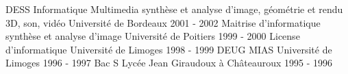 \begin{cvhonors}
  \cvhonor
    {DESS Informatique Multimedia}
    {\lastnewline synthèse et analyse d'image, géométrie et rendu 3D, son,
    vidéo} {Université de Bordeaux}
    {2001 - 2002}
  \cvhonor
    {Maitrise d'informatique}
    {synthèse et analyse d'image}
    {Université de Poitiers}
    {1999 - 2000}
  \cvhonor
    {License d'informatique}
    {}
    {Université de Limoges}
    {1998 - 1999}
  \cvhonor
    {DEUG MIAS}
    {}
    {Université de Limoges}
    {1996 - 1997}
  \cvhonor
    {Bac S}
    {}
    {Lycée Jean Giraudoux à Châteauroux}
    {1995 - 1996}
    {}
\end{cvhonors}
